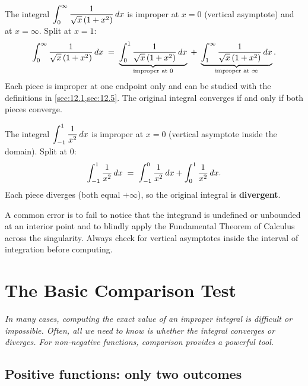 \begin{example}
\label{ex:12-7}
The integral $\displaystyle\int_{0}^{\infty}\frac{1}{\sqrt{x}\,(1+x^{2})}\,dx$ is improper at $x=0$ (vertical asymptote) and at $x=\infty$.  Split at $x=1$:
\[
  \int_{0}^{\infty}\frac{1}{\sqrt{x}\,(1+x^{2})}\,dx
  \;=\;
  \underbrace{\int_{0}^{1}\frac{1}{\sqrt{x}\,(1+x^{2})}\,dx}_{\text{improper at }0}
  \;+\;
  \underbrace{\int_{1}^{\infty}\frac{1}{\sqrt{x}\,(1+x^{2})}\,dx}_{\text{improper at }\infty}.
\]
Each piece is improper at one endpoint only and can be studied with the definitions in \cref{sec:12.1,sec:12.5}.  The original integral converges if and only if both pieces converge.
\end{example}

\begin{example}
\label{ex:12-8}
The integral $\displaystyle\int_{-1}^{1}\frac{1}{x^{2}}\,dx$ is improper at $x=0$ (vertical asymptote inside the domain).  Split at $0$:
\[
  \int_{-1}^{1}\frac{1}{x^{2}}\,dx
  \;=\; \int_{-1}^{0}\frac{1}{x^{2}}\,dx + \int_{0}^{1}\frac{1}{x^{2}}\,dx.
\]
Each piece diverges (both equal $+\infty$), so the original integral is \textbf{divergent}.
\end{example}

\begin{remark}[Warning]
A common error is to fail to notice that the integrand is undefined or unbounded at an interior point and to blindly apply the Fundamental Theorem of Calculus across the singularity.  Always check for vertical asymptotes inside the interval of integration before computing.
\end{remark}

\section{The Basic Comparison Test}
\label{sec:12.7}

\textit{In many cases, computing the exact value of an improper integral is difficult or impossible.  Often, all we need to know is whether the integral converges or diverges.  For non-negative functions, comparison provides a powerful tool.}

\subsection*{Positive functions: only two outcomes}

